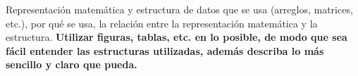 \documentclass[../informe2.tex]{subfiles}
\begin{document}
Representación matemática y estructura de datos que se usa (arreglos,
matrices, etc.), por qué se usa, la relación entre la representación
matemática y la estructura. \textbf{Utilizar figuras, tablas, etc.
en lo posible, de modo que sea fácil entender las estructuras utilizadas,
además describa lo más sencillo y claro que pueda.}
\end{document}
